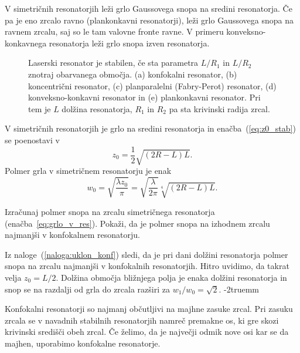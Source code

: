 V simetričnih resonatorjih leži grlo Gaussovega snopa na sredini resonatorja.
Če pa je eno zrcalo ravno (plankonkavni resonatorji), leži grlo Gaussovega snopa 
na ravnem zrcalu, saj so le tam valovne fronte ravne. V primeru konveksno-konkavnega 
resonatorja leži grlo snopa izven resonatorja. 

\begin{figure}[ht]
\centering
\def\svgwidth{95truemm} 

\caption{Laserski resonator je stabilen, 
če sta parametra $L/R_{1}$ in $L/R_{2}$ znotraj obarvanega območja. 
(a) konfokalni resonator,
(b) koncentrični resonator, 
(c) planparalelni (Fabry-Perot) resonator, 
(d) konveksno-konkavni resonator 
in (e) plankonkavni resonator. Pri tem je $L$ dolžina resonatorja, $R_1$ in $R_2$ pa sta
krivinski radija zrcal.}
\label{fig:Podrocje-stabilnih-resonatorjev}
\end{figure}

V simetričnih resonatorjih je grlo na sredini resonatorja in enačba~(\ref{eq:z0_stab}) 
se poenostavi v 
\begin{equation}
z_{0}=\frac{1}{2}\sqrt{(2R-L)L}.
\label{eq:zosim}
\end{equation}
Polmer grla v simetričnem resonatorju je enak
\begin{equation}
w_{0}=\sqrt{\frac{\lambda z_{0}}{\pi}}=\sqrt{\frac{\lambda}{2\pi}}\sqrt[4]{(2R-L)L}.
\label{eq:grlo_v_res}
\end{equation}

\begin{naloga}
\label{naloga:uklon_konf}
 Izračunaj polmer
 snopa na zrcalu simetričnega resonatorja (enačba~\ref{eq:grlo_v_res}). 
 Pokaži, da je polmer snopa na 
 izhodnem zrcalu najmanjši v konfokalnem resonatorju. 
\end{naloga} 

Iz naloge~(\ref{naloga:uklon_konf}) sledi, da je pri dani dolžini 
resonatorja polmer snopa na zrcalu najmanjši v konfokalnih 
resonatorjih.  Hitro uvidimo, da takrat 
velja $z_{0}=L/2$. Dolžina območja bližnjega polja je 
enaka dolžini resonatorja in snop se na razdalji od grla do zrcala razširi
za $w_1/w_0=\sqrt{2}$. 
\vglue-2truemm
\begin{remark}
Konfokalni resonatorji so najmanj občutljivi na majhne zasuke zrcal. 
Pri zasuku zrcala se v navadnih stabilnih resonatorjih namreč premakne os, ki gre skozi 
krivinski središči obeh zrcal. Če želimo, da je največji odmik nove osi kar se da
majhen, uporabimo konfokalne resonatorje. 
\end{remark}

